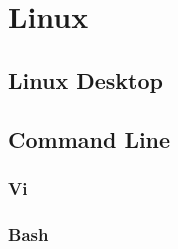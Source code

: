 \chapter{Linux}

\section{Linux Desktop}

\section{Command Line}

\subsection{Vi}

\subsection{Bash}
